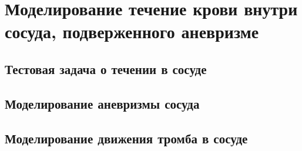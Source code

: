 \chapter{Моделирование течение крови внутри сосуда, подверженного аневризме} \label{chapt2}

\section{Тестовая задача о течении в сосуде} \label{sect2_1}

\section{Моделирование аневризмы сосуда} \label{sect2_2}

\section{Моделирование движения тромба в сосуде} \label{sect2_3}

\clearpage
